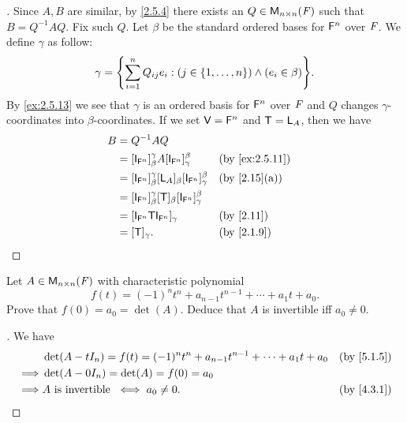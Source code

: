 \begin{proof}[]
  Since \(A, B\) are similar, by \cref{2.5.4} there exists an \(Q \in \ms[n][n][\F]\) such that \(B = Q^{-1} A Q\).
  Fix such \(Q\).
  Let \(\beta\) be the standard ordered bases for \(\mathsf{F}^n\) over \(\mathit{F}\).
  We define \(\gamma\) as follow:
  \[
    \gamma = \set{\sum_{i = 1}^n Q_{i j} e_i : (j \in \set{1, \dots, n}) \land (e_i \in \beta)}.
  \]
  By \cref{ex:2.5.13} we see that \(\gamma\) is an ordered basis for \(\mathsf{F}^n\) over \(\mathit{F}\) and \(Q\) changes \(\gamma\)-coordinates into \(\beta\)-coordinates.
  If we set \(\mathsf{V} = \mathsf{F}^n\) and \(\mathsf{T} = \mathsf{L}_A\), then we have
  \begin{align*}
    B & = Q^{-1} A Q                                                                                           \\
      & = [\IT[\vs{F}^n]]_{\beta}^{\gamma} A [\IT[\vs{F}^n]]_{\gamma}^{\beta}              &  & \by{ex:2.5.11} \\
      & = [\IT[\vs{F}^n]]_{\beta}^{\gamma} [\L_A]_{\beta} [\IT[\vs{F}^n]]_{\gamma}^{\beta} &  & \by{2.15}[a]   \\
      & = [\IT[\vs{F}^n]]_{\beta}^{\gamma} [\T]_{\beta} [\IT[\vs{F}^n]]_{\gamma}^{\beta}                       \\
      & = [\IT[\vs{F}^n] \T \IT[\vs{F}^n]]_{\gamma}                                        &  & \by{2.11}      \\
      & = [\T]_{\gamma}.                                                                   &  & \by{2.1.9}
  \end{align*}
\end{proof}

\begin{ex}\label{ex:5.1.20}
  Let \(A \in \ms[n][n][\F]\) with characteristic polynomial
  \[
    f(t) = (-1)^n t^n + a_{n - 1} t^{n - 1} + \cdots + a_1 t + a_0.
  \]
  Prove that \(f(0) = a_0 = \det(A)\).
  Deduce that \(A\) is invertible iff \(a_0 \neq 0\).
\end{ex}

\begin{proof}[]
  We have
  \begin{align*}
             & \det(A - t I_n) = f(t) = (-1)^n t^n + a_{n - 1} t^{n - 1} + \cdots + a_1 t + a_0 &  & \by{5.1.5} \\
    \implies & \det(A - 0 I_n) = \det(A) = f(0) = a_0                                                           \\
    \implies & A \text{ is invertible } \iff a_0 \neq 0.                                        &  & \by{4.3.1}
  \end{align*}
\end{proof}

